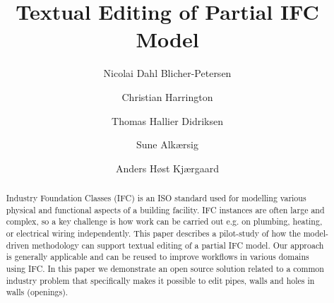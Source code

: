 \documentclass[oribibl]{llncs}
\begin{document}

\mainmatter              %
\title{Textual Editing of Partial IFC Model}

\author{Nicolai Dahl Blicher-Petersen \and Christian Harrington \and
Thomas Hallier Didriksen \and Sune Alkærsig \and Anders Høst Kjærgaard\\
}



\maketitle              %

\begin{abstract}
Industry Foundation Classes (IFC) is an ISO standard used for modelling various physical and functional aspects of a building facility. IFC instances are often large and complex, so a key challenge is how work can be carried out e.g. on plumbing, heating, or electrical wiring independently.  This paper describes a pilot-study of how the model-driven methodology can support textual editing of a partial IFC model. Our approach is generally applicable and can be reused to improve workflows in various domains using IFC. In this paper we demonstrate an open source solution related to a common industry problem that specifically makes it possible to edit pipes, walls and holes in walls (openings).

\end{abstract}











\end{document}
